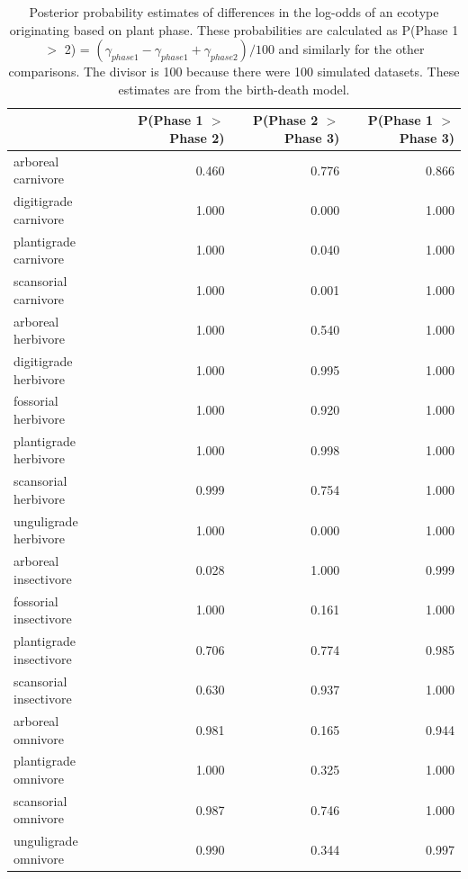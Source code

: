 \documentclass[12pt,letterpaper]{article}
\begin{document}
\begin{table}[ht]
  \centering
  \caption[Posterior probablity estimates of differences in origination by plant phase]{Posterior probability estimates of differences in the log-odds of an ecotype originating based on plant phase. These probabilities are calculated as P(Phase 1 \(>\) 2) = \( (\gamma_{phase 1} - \gamma_{phase 1} + \gamma_{phase 2}) / 100\) and similarly for the other comparisons. The divisor is 100 because there were 100 simulated datasets. These estimates are from the birth-death model.}
  \label{tab:origin_plant}
  \begin{tabular}{ l r r r }
    \hline
    & P(Phase 1 $>$ Phase 2) & P(Phase 2 $>$ Phase 3) & P(Phase 1 $>$ Phase 3) \\ 
    \hline
    arboreal carnivore & 0.460 & 0.776 & 0.866 \\ 
    digitigrade carnivore & 1.000 & 0.000 & 1.000 \\ 
    plantigrade carnivore & 1.000 & 0.040 & 1.000 \\ 
    scansorial carnivore & 1.000 & 0.001 & 1.000 \\ 
    arboreal herbivore & 1.000 & 0.540 & 1.000 \\ 
    digitigrade herbivore & 1.000 & 0.995 & 1.000 \\ 
    fossorial herbivore & 1.000 & 0.920 & 1.000 \\ 
    plantigrade herbivore & 1.000 & 0.998 & 1.000 \\ 
    scansorial herbivore & 0.999 & 0.754 & 1.000 \\ 
    unguligrade herbivore & 1.000 & 0.000 & 1.000 \\ 
    arboreal insectivore & 0.028 & 1.000 & 0.999 \\ 
    fossorial insectivore & 1.000 & 0.161 & 1.000 \\ 
    plantigrade insectivore & 0.706 & 0.774 & 0.985 \\ 
    scansorial insectivore & 0.630 & 0.937 & 1.000 \\ 
    arboreal omnivore & 0.981 & 0.165 & 0.944 \\ 
    plantigrade omnivore & 1.000 & 0.325 & 1.000 \\ 
    scansorial omnivore & 0.987 & 0.746 & 1.000 \\ 
    unguligrade omnivore & 0.990 & 0.344 & 0.997 \\ 
    \hline
  \end{tabular}
\end{table}
\end{document}
